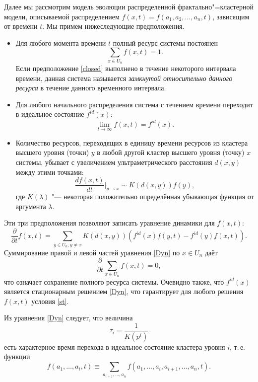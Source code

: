 Далее мы рассмотрим модель эволюции распределенной
фрактально"=кластерной модели, описываемой распределением
$f(x,t)=f(a_1,a_2,\ldots,a_n,t)$, зависящим от времени $t$. Мы
примем нижеследующие предположения.

\begin{itemize}

\item[1.] Для любого момента времени $t$ полный ресурс системы постоянен
\begin{equation}
\sum_{x\in U_{n}}f(x,t)=1.\label{closed}
\end{equation}
Если предположение \eqref{closed} выполнено в течение некоторого
интервала времени, данная система называется {\sl замкнутой
относительно данного ресурса} в течение данного временного
интервала.

\item[2.] Для любого начального распределения система с течением времени
переходит в идеальное состояние $f^{id}(x)$:
\begin{equation}
\lim_{t\rightarrow\infty}f(x,t)=f^{id}(x).\label{st}
\end{equation}

\item[3.] Количество ресурсов, переходящих в единицу времени ресурсов из
кластера высшего уровня (точки) $y$ в любой другой кластер высшего
уровня (точку) $x$ системы, убывает с увеличением
ультраметрического расстояния $d(x,y)$ между этими точками:
\[
\dfrac{df(x,t)}{dt}\Big|_{y\rightarrow x} \sim K (d(x,y))f(y),
\]
где $K(\lambda)$ "--- некоторая положительно определённая
убывающая функция от аргумента $\lambda$.

\end{itemize}


Эти три предположения позволяют записать уравнение динамики для $f(x,t)$:
\begin{equation}
\frac{\partial}{\partial t}f(x,t)=\sum_{y\in U_{n}, y\neq x}K
(d(x,y))\left(f^{id}(x)f(y,t)-f^{id}(y)f(x,t)\right).\label{Dyn}
\end{equation}
Суммирование правой и левой частей уравнения \eqref{Dyn} по $x\in
U_n$ даёт
\[
\dfrac{\partial}{\partial t}\sum_{x\in U_{n}}f(x,t)=0,
\]
что означает сохранение полного ресурса системы. 
Очевидно также, что $f^{id}(x)$ является стационарным решением \eqref{Dyn}, что
гарантирует для любого решения $f(x,t)$ условия \eqref{st}.

Из уравнения \eqref{Dyn} следует, что величина
\begin{equation}
\tau_{i}=\dfrac{1}{K(p^{i})}\label{tau}
\end{equation}
 есть характерное время перехода в идеальное состояние кластера уровня
$i$, т.\,е. функции
\begin{equation*}
f(a_1,\ldots,a_i,t)  \equiv
\sum_{a_{i+1},\ldots,a_n}f(a_1,\ldots,a_i,a_{i+1},\ldots,a_n,t).
\end{equation*}

